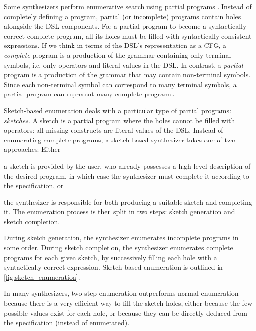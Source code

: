 Some synthesizers perform enumerative search using partial programs \cite{Solar-LezamaPhDThesis,DBLP:conf/pldi/Solar-LezamaRBE05,DBLP:conf/asplos/Solar-LezamaTBSS06,DBLP:conf/pldi/WangCB17,DanielThesis,Regel20,DBLP:conf/pldi/FengMGDC17,DBLP:conf/popl/FengM0DR17,DBLP:journals/pacmpl/Yaghmazadeh0DD17,DBLP:journals/sttt/Solar-Lezama13}.
Instead of completely defining a program, partial (or incomplete) programs contain holes alongside the \ac{DSL} components. %
For a partial program to become a syntactically correct complete program, all its holes must be filled with syntactically consistent expressions.
%
If we think in terms of the \ac{DSL}'s representation as a \ac{CFG}, a \textit{complete} program is a production of the grammar containing only terminal symbols, i.e, only operators and literal values in the \ac{DSL}. In contrast, a \textit{partial} program is a production of the grammar that may contain non-terminal symbols. Since each non-terminal symbol can correspond to many terminal symbols, a partial program can represent many complete programs.

Sketch-based enumeration deals with a particular type of partial programs: \textit{sketches}. A sketch is a partial program where the holes cannot be filled with operators: all missing constructs are literal values of the \ac{DSL}.
%
Instead of enumerating complete programs, a sketch-based synthesizer takes one of two approaches: Either
\begin{enumerate*}[label=(\roman*)]
    \item a sketch is provided by the user, who already possesses a high-level description of the desired program, in which case the synthesizer must complete it according to the specification, or
    \item the synthesizer is responsible for both producing a suitable sketch and completing it. The enumeration process is then split in two steps: sketch generation and sketch completion.
\end{enumerate*}
During sketch generation, the synthesizer enumerates incomplete programs in some order. During sketch completion, the synthesizer enumerates complete programs for each given sketch, by successively filling each hole with a syntactically correct expression. Sketch-based enumeration is outlined in \autoref{fig:sketch_enumeration}.

In many synthesizers, two-step enumeration outperforms normal enumeration because there is a very efficient way to fill the sketch holes, either because the few possible values exist for each hole, or because they can be directly deduced from the specification (instead of enumerated).



